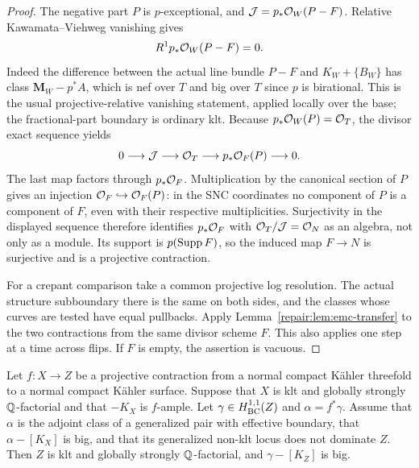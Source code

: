 \begin{proof}
The negative part $P$ is $p$-exceptional, and
$\mathcal J=p_*\mathcal O_W(P-F)$. Relative Kawamata--Viehweg vanishing
gives
\[
                        R^1p_*\mathcal O_W(P-F)=0.
\]
Indeed the difference between the actual line bundle $P-F$ and
$K_W+\{B_W\}$ has class $\mathbf M_W-p^*A$, which is nef over
$T$ and big over $T$ since $p$ is birational. This is the usual
projective-relative vanishing statement, applied locally over the
base; the fractional-part boundary is ordinary klt.
Because $p_*\mathcal O_W(P)=\mathcal O_T$, the divisor exact sequence yields
\[
 0\longrightarrow\mathcal J\longrightarrow\mathcal O_T
   \longrightarrow p_*\mathcal O_F(P)\longrightarrow0.
\]
The last map factors through $p_*\mathcal O_F$. Multiplication by the
canonical section of $P$ gives an injection
$\mathcal O_F\hookrightarrow\mathcal O_F(P)$: in the SNC coordinates no
component of $P$ is a component of $F$, even with their respective
multiplicities. Surjectivity in the displayed sequence therefore
identifies $p_*\mathcal O_F$ with $\mathcal O_T/\mathcal J=\mathcal O_N$ as an
algebra, not only as a module. Its support is $p(\operatorname{Supp} F)$, so the
induced map $F\to N$ is surjective and is a projective contraction.

For a crepant comparison take a common projective log resolution.
The actual structure subboundary there is the same on both sides,
and the classes whose curves are tested have equal pullbacks.
Apply Lemma~\ref{repair:lem:emc-transfer} to the two contractions
from the same divisor scheme $F$. This also applies one step at a
time across flips. If $F$ is empty, the assertion is vacuous.
\end{proof}

\begin{lemma}
\label{repair:lem:surface-base-positivity}
Let $f:X\to Z$ be a projective contraction from a normal compact
K\"ahler threefold to a normal compact K\"ahler surface. Suppose that
$X$ is klt and globally strongly $\mathbb Q$-factorial and that $-K_X$ is
$f$-ample. Let $\gamma\in H^{1,1}_{\mathrm{BC}}(Z)$ and $\alpha=f^*\gamma$. Assume that
$\alpha$ is the adjoint class of a generalized pair with effective
boundary, that $\alpha-[K_X]$ is big, and that its generalized
non-klt locus does not dominate $Z$. Then $Z$ is klt and globally
strongly $\mathbb Q$-factorial, and $\gamma-[K_Z]$ is big.
\end{lemma}

